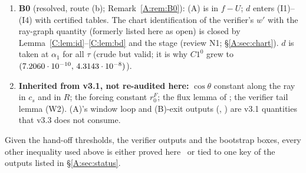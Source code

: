 \documentclass[11pt]{article}
\begin{document}
\begin{enumerate}[label=(G-A\arabic*),leftmargin=3.4em]
\item \textbf{B0} (resolved, route (b); Remark~\ref{A:rem:B0}): (A) is in $f-U$; $d$ enters (I1)--(I4) with certified tables. The chart identification of the verifier's $w'$ with the ray-graph quantity (formerly listed here as open) is closed by Lemma~\ref{C:lem:id}--\ref{C:lem:bd} and the stage  (review N1; \S\ref{A:sec:chart}). $d$ is taken at $\alpha_1$ for all $\tau$ (crude but valid; it is why $C1^0$ grew to $(7.2060\cdot10^{-10},\,4.3143\cdot10^{-8})$).
\item \textbf{Inherited from v3.1, not re-audited here:} $\cos\theta$ constant along the ray in $c_s$ and in $R$; the forcing constant $r^F_0$; the flux lemma of ; the verifier tail lemma (W2). (A)'s window loop and (B)-exit outputs (, ) are v3.1 quantities that v3.3 does not consume.
\end{enumerate}
Given the hand-off thresholds, the verifier outputs and the bootstrap boxes, every other inequality used above is either proved here \tP\ or tied to one key of the outputs listed in \S\ref{A:sec:status}.

\ifdefined\stepmain\else
\end{document}
